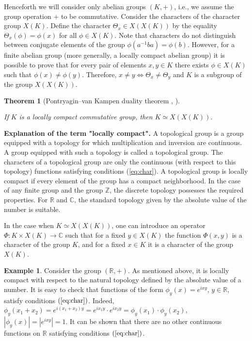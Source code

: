 \documentclass[11pt]{article}
\newtheorem{theorem}{Theorem}[section]
\theoremstyle{definition}
\newtheorem{example}{Example}[section]
\begin{document}
{{{%


Henceforth we will consider only abelian groups $(K, +)$, i.e.,
we assume the group operation $+$ to be commutative. Consider the characters
of the character group $X(K)$. Define the character $\Theta_x\in X(X(K))$
by the equality $\Theta_x(\phi)=\phi(x)$ for all $\phi\in X(K)$. 
Note that characters do not distinguish between 
conjugate elements of the group $\phi(a^{-1}ba)=\phi(b)$. 
However, for a finite abelian group (more generally, a locally compact abelian group) it is possible to prove that for every pair of elements $x,y\in K$ there exists $ \phi\in X(K)$  such that $\phi(x)\ne\phi(y)$. Therefore, $x\ne y \Leftrightarrow
\Theta_x\ne\Theta_y$ and $K$
is a subgroup of the group $X(X(K))$.  


\begin{theorem}[Pontryagin--van Kampen duality theorem \cite{Morris}, \cite{RS}]\label{thPK}

    If $K$ is a locally compact commutative group, then $K\simeq X(X(K))$.
\end{theorem}

{\bf Explanation of the term "locally compact".}  A topological group is a group equipped with a topology for which multiplication and inversion are continuous. A group equipped with such a topology
is called a topological group. The characters of a topological group
are only the continuous (with respect to this topology) functions
satisfying conditions (\ref{eq:char}). A topological group
is locally compact if every element of the group has a compact
neighborhood. In the case of any finite group and the group $\mathbb{Z}$,
the discrete topology possesses the required properties. For
$\mathbb{R}$ and $\mathbb{C}$, the standard topology given by the
absolute value of the number is suitable.

In the case when $K\simeq X(X(K))$, one can introduce an operator
$\Phi:K\times X(K)\rightarrow \mathbb{C}$ such that for
a fixed $y\in X(K)$ the function $\Phi(x,y)$ is a character of the
group $K$, and for a fixed $x\in K$ it is a character of the group
$X(K)$.

\begin{example}
 Consider the group $(\mathbb{R},+)$. As mentioned above,  it is locally compact with respect to the
 natural topology defined by the absolute value of a number. It is easy to check that
functions of the form $\phi_y(x)=e^{ixy}$, $y\in \mathbb{R}$, satisfy
conditions $(\ref{eq:char})$. Indeed,
$\phi_y(x_1+x_2)=e^{i(x_1+x_2)y}=e^{ix_1y}\cdot
e^{ix_2y}=\phi_y(x_1)\cdot\phi_y(x_2)$, $|\phi_y(x)|=|e^{ixy}|=1$.
It can be shown that there are no other continuous functions on $\mathbb{R}$
satisfying conditions $(\ref{eq:char})$.


\end{example}}}}
\end{document}
